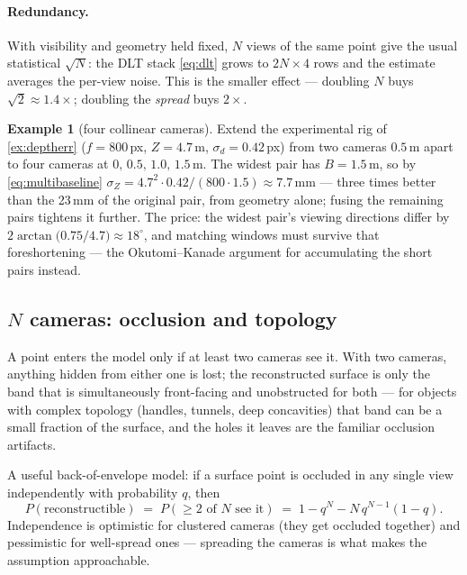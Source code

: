 \documentclass[11pt]{article}
\theoremstyle{definition}
\newtheorem{example}{Example}
\begin{document}
\paragraph{Redundancy.} With visibility and geometry held fixed,
$N$ views of the same point give the usual statistical $\sqrt{N}$: the DLT
stack \eqref{eq:dlt} grows to $2N\times4$ rows and the estimate averages the
per-view noise. This is the smaller effect --- doubling $N$ buys
$\sqrt2\approx1.4\times$; doubling the \emph{spread} buys $2\times$.

\begin{example}[four collinear cameras]
\label{ex:ncams}
Extend the experimental rig of \autoref{ex:deptherr} ($f=800$\,px,
$Z=4.7$\,m, $\sigma_d=0.42$\,px) from two cameras $0.5$\,m apart to four
cameras at $0,\,0.5,\,1.0,\,1.5$\,m. The widest pair has $B=1.5$\,m, so by
\eqref{eq:multibaseline}
$\sigma_Z = 4.7^2\cdot0.42/(800\cdot1.5) \approx 7.7$\,mm --- three times
better than the 23\,mm of the original pair, from geometry alone; fusing
the remaining pairs tightens it further. The price: the widest pair's
viewing directions differ by
$2\arctan\!\bigl(0.75/4.7\bigr)\approx18^\circ$, and matching windows must
survive that foreshortening --- the Okutomi--Kanade argument for
accumulating the short pairs instead.
\end{example}

\subsection{$N$ cameras: occlusion and topology}
\label{sec:occlusion}

A point enters the model only if at least two cameras see it. With two
cameras, anything hidden from either one is lost; the reconstructed surface
is only the band that is simultaneously front-facing and unobstructed for
both --- for objects with complex topology (handles, tunnels, deep
concavities) that band can be a small fraction of the surface, and the
holes it leaves are the familiar occlusion artifacts.

A useful back-of-envelope model: if a surface point is occluded in any
single view independently with probability $q$, then
\begin{equation}
P(\text{reconstructible}) \;=\; P(\ge2\text{ of }N\text{ see it})
\;=\; 1-q^N-N\,q^{N-1}(1-q).
\label{eq:occlusionprob}
\end{equation}
Independence is optimistic for clustered cameras (they get occluded
together) and pessimistic for well-spread ones --- spreading the cameras is
what makes the assumption approachable.
\end{document}
